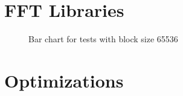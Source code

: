 \section{FFT Libraries}

\begin{figure}
    \centering
    \resizebox{\columnwidth}{!}{
        
    }
    \label{tab:barchart:65536}
    \caption{Bar chart for tests with block size 65536}
\end{figure}



\section{Optimizations}
